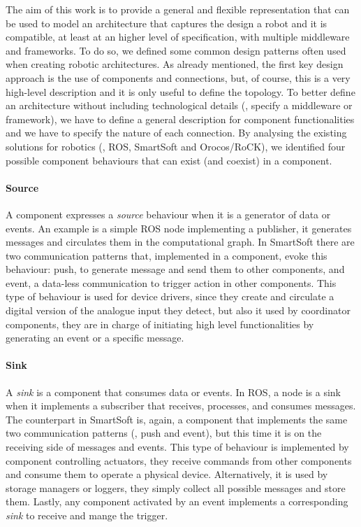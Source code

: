 The aim of this work is to provide a general and flexible representation that can be used to model an architecture that captures the design a robot and it is compatible, at least at an higher level of specification, with multiple middleware and frameworks. To do so, we defined some common design patterns often used when creating robotic architectures. As already mentioned, the first key design approach is the use of components and connections, but, of course, this is a very high-level description and it is only useful to define the topology. To better define an architecture without including technological details (\ie, specify a middleware or framework), we have to define a general description for component functionalities and we have to specify the nature of each connection. By analysing the existing solutions for robotics (\ie, ROS, SmartSoft and Orocos/RoCK), we identified four possible component behaviours that can exist (and coexist) in a component.

\paragraph{Source} A component expresses a \textit{source} behaviour when it is a generator of data or events. An example is a simple ROS node implementing a publisher, it generates messages and circulates them in the computational graph. In SmartSoft there are two communication patterns that, implemented in a component, evoke this behaviour: push, to generate message and send them to other components, and event, a data-less communication to trigger action in other components. This type of behaviour is used for device drivers, since they create and circulate a digital version of the analogue input they detect, but also it used by coordinator components, they are in charge of initiating high level functionalities by generating an event or a specific message.

\paragraph{Sink} A \textit{sink} is a component that consumes data or events. In ROS, a node is a sink when it implements a subscriber that receives, processes, and consumes messages. The counterpart in SmartSoft is, again, a component that implements the same two communication patterns (\ie, push and event), but this time it is on the receiving side of messages and events. This type of behaviour is implemented by component controlling actuators, they receive commands from other components and consume them to operate a physical device. Alternatively, it is used by storage managers or loggers, they simply collect all possible messages and store them. Lastly, any component activated by an event implements a corresponding \textit{sink} to receive and mange the trigger.

